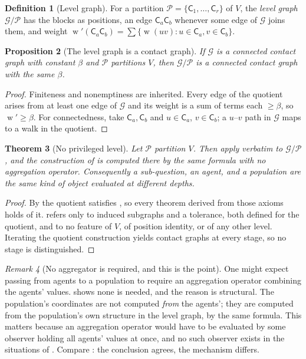 \documentclass[11pt,a4paper]{article}
\theoremstyle{clstyle}
\newtheorem{theorem}{Theorem}[section]
\newtheorem{proposition}[theorem]{Proposition}
\theoremstyle{definition}
\newtheorem{definition}[theorem]{Definition}
\theoremstyle{remark}
\newtheorem{remark}[theorem]{Remark}
\DeclareMathOperator{\wt}{w}
\newcommand{\Gph}{\mathcal{G}}
\newcommand{\V}{V}
\newcommand{\flo}{\beta}
\newcommand{\Cell}{\mathsf{C}}
\begin{document}
\begin{definition}[Level graph]
\label{def:level}
For a partition $\mathcal{P}=\{\Cell_1,\dots,\Cell_r\}$ of $\V$, the
\emph{level graph} $\Gph/\mathcal{P}$ has the blocks as positions, an edge
$\Cell_a\Cell_b$ whenever some edge of $\Gph$ joins them, and weight
$\wt'(\Cell_a\Cell_b)=\sum\{\wt(uv): u\in\Cell_a, v\in\Cell_b\}$.
\end{definition}

\begin{proposition}[The level graph is a contact graph]
\label{prop:level}
If $\Gph$ is a connected contact graph with constant $\flo$ and
$\mathcal{P}$ partitions $\V$, then $\Gph/\mathcal{P}$ is a connected contact
graph with the same $\flo$.
\end{proposition}

\begin{proof}
Finiteness and nonemptiness are inherited. Every edge of the quotient arises
from at least one edge of $\Gph$ and its weight is a sum of terms each
$\ge\flo$, so $\wt'\ge\flo$. For connectedness, take
$\Cell_a,\Cell_b$ and $u\in\Cell_a$, $v\in\Cell_b$; a $u$--$v$ path in
$\Gph$ maps to a walk in the quotient.
\end{proof}

\begin{theorem}[No privileged level]
\label{thm:nopriv}
Let $\mathcal{P}$ partition $\V$. Then  apply
verbatim to $\Gph/\mathcal{P}$, and the construction of
 is computed there by the same formula with no
aggregation operator. Consequently a sub-question, an agent, and a
population are the same kind of object evaluated at different depths.
\end{theorem}

\begin{proof}
By  the quotient satisfies
, so every theorem derived from those
axioms holds of it.  refers only to induced subgraphs
and a tolerance, both defined for the quotient, and to no feature of $\V$,
of position identity, or of any other level. Iterating the quotient
construction yields contact graphs at every stage, so no stage is
distinguished.
\end{proof}

\begin{remark}[No aggregator is required, and this is the point]
\label{rem:no-agg}
One might expect passing from agents to a population to require an
aggregation operator combining the agents' values.  shows
none is needed, and the reason is structural. The population's coordinates
are not computed \emph{from} the agents'; they are computed from the
population's own structure in the level graph, by the same formula. This
matters because an aggregation operator would have to be evaluated by some
observer holding all agents' values at once, and no such observer exists in
the situations of . Compare \citet{hayek1945use}: the
conclusion agrees, the mechanism differs.
\end{remark}
\end{document}
